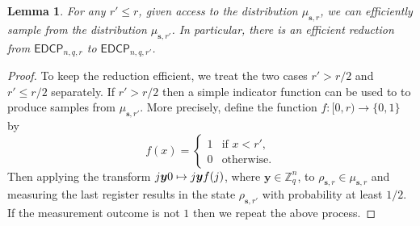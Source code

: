\documentclass[11pt]{article}
\theoremstyle{plain}
\newtheorem{lemma}[theorem]{Lemma}
\theoremstyle{definition}
\let\ket\relax
\DeclarePairedDelimiter{\ket}{\lvert}{\rangle}
\def\Z{\mathbb{Z}}
\def\edcp{\mathsf{EDCP}}
\begin{document}
\begin{lemma}
    \label{lem:self-rd}
    For any $r' \le r$, given access to the distribution $\mu_{\bm{s}, r}$, we can efficiently sample from the distribution $\mu_{\bm{s}, r'}$. In particular, there is an efficient reduction from $\edcp_{n, q, r}$ to $\edcp_{n, q, r'}$.
\end{lemma}
\begin{proof}
    To keep the reduction efficient, we treat the two cases $r' > r / 2$ and $r' \le r / 2$ separately. If $r' > r / 2$ then a simple indicator function can be used to to produce samples from $\mu_{\bm{s}, r'}$. More precisely, define the function $f: [0, r) \rightarrow \{ 0, 1 \}$ by
    \[ f(x) = 
    \begin{cases}
        1 & \text{if } x < r', \\
        0 & \text{otherwise}.
    \end{cases} \]
    Then applying the transform $\ket{j}\ket{\bm{y}}\ket{0} \mapsto \ket{j}\ket{\bm{y}}\ket{f(j)}$, where $\bm{y} \in \Z_q^n$, to $\rho_{\bm{s}, r} \in \mu_{\bm{s}, r}$ and measuring the last register results in the state $\rho_{\bm{s}, r'}$ with probability at least $1 / 2$. If the measurement outcome is not $1$ then we repeat the above process.


\end{proof}
\end{document}
